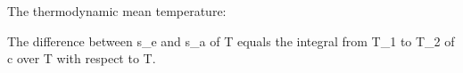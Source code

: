The thermodynamic mean temperature:

The difference between s_e and s_a of T equals the integral from T_1 to T_2 of c over T with respect to T.